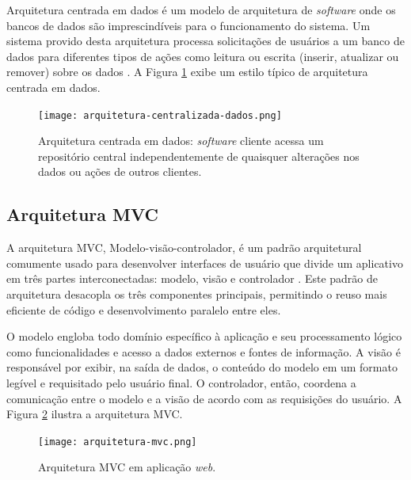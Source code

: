 Arquitetura centrada em dados é um modelo de arquitetura de \textit{software} onde os bancos de dados são imprescindíveis para o funcionamento do sistema. Um sistema provido desta arquitetura processa solicitações de usuários a um banco de dados para diferentes tipos de ações como leitura ou escrita (inserir, atualizar ou remover) sobre os dados \cite{lewisBook}. A Figura \ref{dataCenteredArchitecture} exibe um estilo típico de arquitetura centrada em dados.

\begin{figure}[ht]
    \caption{Arquitetura centrada em dados: \textit{software} cliente acessa um repositório central independentemente de quaisquer alterações nos dados ou ações de outros clientes. }
       	\begin{center}
            \texttt{[image: arquitetura-centralizada-dados.png]}
        \end{center}
    \label{dataCenteredArchitecture}
\end{figure}


\subsection{Arquitetura MVC}
\label{arquiteturaMVC}

A arquitetura MVC, Modelo-visão-controlador, é um padrão arquitetural comumente usado para desenvolver interfaces de usuário que divide um aplicativo em três partes interconectadas: modelo, visão e controlador \cite{mvcCookbook}. Este padrão de arquitetura desacopla os três componentes principais, permitindo o reuso mais eficiente de código e desenvolvimento paralelo entre eles. 

O modelo engloba todo domínio específico à aplicação e seu processamento lógico como funcionalidades e acesso a dados externos e fontes de informação. A visão é responsável por exibir, na saída de dados, o conteúdo do modelo em um formato legível e requisitado pelo usuário final. O controlador, então, coordena a comunicação entre o modelo e a visão de acordo com as requisições do usuário. A Figura \ref{dataMVCArchitecture} ilustra a arquitetura MVC.

\begin{figure}[ht]
    \caption{Arquitetura MVC em aplicação \textit{web}.}
       	\begin{center}
            \texttt{[image: arquitetura-mvc.png]}
        \end{center}
    \label{dataMVCArchitecture}
\end{figure}


